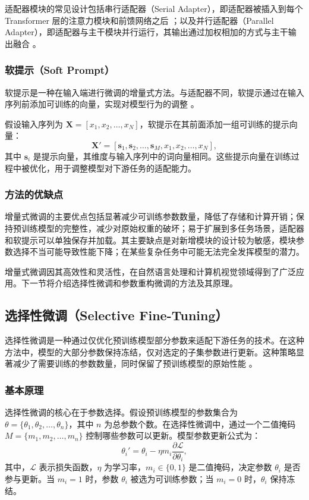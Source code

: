 \documentclass[12pt,a4paper,twoside]{article} %
\begin{document}
\begin{multicols}{2}
适配器模块的常见设计包括串行适配器（Serial Adapter），即适配器被插入到每个 Transformer 层的注意力模块和前馈网络之后 \cite{serial_adapter}；以及并行适配器（Parallel Adapter），即适配器与主干模块并行运行，其输出通过加权相加的方式与主干输出融合 \cite{parallel_adapter}。

\subsubsection{软提示（Soft Prompt）}
软提示是一种在输入端进行微调的增量式方法。与适配器不同，软提示通过在输入序列前添加可训练的向量，实现对模型行为的调整 \cite{soft_prompt}。

假设输入序列为 $\mathbf{X} = [x_1, x_2, \dots, x_N]$，软提示在其前面添加一组可训练的提示向量：
\begin{equation}
\mathbf{X}' = [\mathbf{s}_1, \mathbf{s}_2, \dots, \mathbf{s}_M, x_1, x_2, \dots, x_N],
\end{equation}
其中 $\mathbf{s}_i$ 是提示向量，其维度与输入序列中的词向量相同。这些提示向量在训练过程中被优化，用于调整模型对下游任务的适配能力。

\subsubsection{方法的优缺点}
增量式微调的主要优点包括显著减少可训练参数数量，降低了存储和计算开销；保持预训练模型的完整性，减少对原始权重的破坏；易于扩展到多任务场景，适配器和软提示可以单独保存并加载。其主要缺点是对新增模块的设计较为敏感，模块参数选择不当可能导致性能下降；在某些复杂任务中可能无法完全发挥模型的潜力。

增量式微调因其高效性和灵活性，在自然语言处理和计算机视觉领域得到了广泛应用。下一节将介绍选择性微调和参数重构微调的方法及其原理。



\subsection{选择性微调（Selective Fine-Tuning）}

选择性微调是一种通过仅优化预训练模型部分参数来适配下游任务的技术。在这种方法中，模型的大部分参数保持冻结，仅对选定的子集参数进行更新。这种策略显著减少了需要训练的参数数量，同时保留了预训练模型的原始性能 \cite{han2024peft}。

\subsubsection{基本原理}
选择性微调的核心在于参数选择。假设预训练模型的参数集合为 $\theta = \{\theta_1, \theta_2, \dots, \theta_n\}$，其中 $n$ 为总参数个数。在选择性微调中，通过一个二值掩码 $M = \{m_1, m_2, \dots, m_n\}$ 控制哪些参数可以更新。模型参数更新公式为：
\begin{equation}
\theta_i' = \theta_i - \eta m_i \frac{\partial \mathcal{L}}{\partial \theta_i},
\label{eq:selective}
\end{equation}
其中，$\mathcal{L}$ 表示损失函数，$\eta$ 为学习率，$m_i \in \{0, 1\}$ 是二值掩码，决定参数 $\theta_i$ 是否参与更新。当 $m_i=1$ 时，参数 $\theta_i$ 被选为可训练参数；当 $m_i=0$ 时，$\theta_i$ 保持冻结。


\end{multicols}
\end{document}
